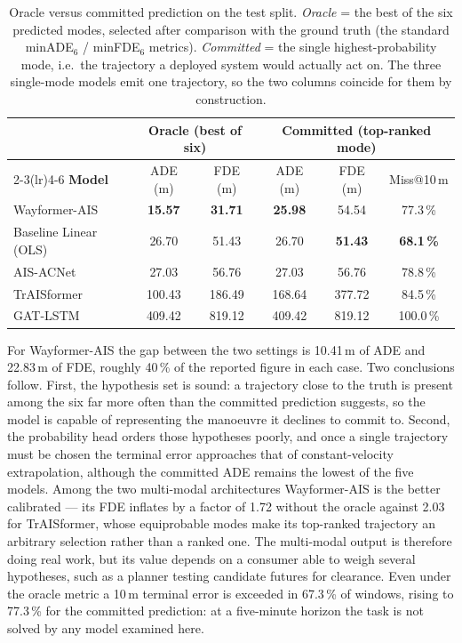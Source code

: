 \documentclass[12pt, a4paper]{article}
\begin{document}
  \begin{table}[H]
    \centering
    \small
    \caption{Oracle versus committed prediction on the test split.
             \emph{Oracle} = the best of the six predicted modes, selected after
             comparison with the ground truth (the standard minADE$_6$ /
             minFDE$_6$ metrics).  \emph{Committed} = the single
             highest-probability mode, i.e.\ the trajectory a deployed system
             would actually act on.  The three single-mode models emit one
             trajectory, so the two columns coincide for them by construction.}
    \label{tab:topmode}
    \begin{tabular}{lccccc}
      \toprule
      & \multicolumn{2}{c}{\textbf{Oracle (best of six)}}
      & \multicolumn{3}{c}{\textbf{Committed (top-ranked mode)}} \\
      \cmidrule(lr){2-3}\cmidrule(lr){4-6}
      \textbf{Model} & ADE (m) & FDE (m) & ADE (m) & FDE (m) & Miss@10\,m \\
      \midrule
      Wayformer-AIS         & \textbf{15.57} & \textbf{31.71}
                            & \textbf{25.98} & 54.54 & 77.3\,\% \\
      Baseline Linear (OLS) & 26.70 & 51.43 & 26.70 & \textbf{51.43} & \textbf{68.1\,\%} \\
      AIS-ACNet             & 27.03 & 56.76 & 27.03 & 56.76 & 78.8\,\% \\
      TrAISformer           & 100.43 & 186.49 & 168.64 & 377.72 & 84.5\,\% \\
      GAT-LSTM              & 409.42 & 819.12 & 409.42 & 819.12 & 100.0\,\% \\
      \bottomrule
    \end{tabular}
  \end{table}

  For Wayformer-AIS the gap between the two settings is 10.41\,m of ADE and
  22.83\,m of FDE, roughly 40\,\% of the reported figure in each case.  Two
  conclusions follow.  First, the hypothesis set is sound: a trajectory close to
  the truth is present among the six far more often than the committed prediction
  suggests, so the model is capable of representing the manoeuvre it declines to
  commit to.  Second, the probability head orders those hypotheses poorly, and
  once a single trajectory must be chosen the terminal error approaches that of
  constant-velocity extrapolation, although the committed ADE remains the lowest
  of the five models.  Among the two multi-modal architectures Wayformer-AIS is
  the better calibrated --- its FDE inflates by a factor of 1.72 without the oracle
  against 2.03 for TrAISformer, whose equiprobable modes make its top-ranked
  trajectory an arbitrary selection rather than a ranked one.  The multi-modal
  output is therefore doing real work, but its value depends on a consumer able to
  weigh several hypotheses, such as a planner testing candidate futures for
  clearance.  Even under the oracle metric a 10\,m terminal error is exceeded in
  67.3\,\% of windows, rising to 77.3\,\% for the committed prediction: at a
  five-minute horizon the task is not solved by any model examined here.
\end{document}
